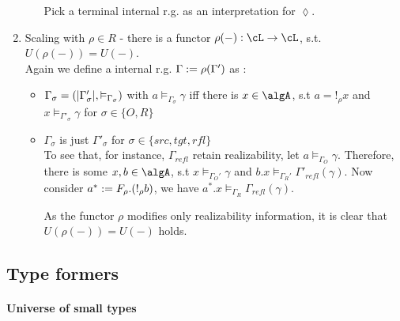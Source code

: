 \documentclass[12pt,a4paper]{article}
\def\rfl{_{refl}}\alwaysmath{rfl}
\renewcommand{\O}{_{O}}\alwaysmath{O}
\def\R{_{R}}\alwaysmath{R}
\begin{document}
\begin{enumerate}[noitemsep]
\begin{itemize}[noitemsep]
    Pick a terminal internal r.g. as an interpretation for $\lozenge$.
  \end{itemize}  
  \item Scaling with $\rho \in R$ - there is a functor $\rho(-) : \cL \to \cL$, s.t. $U(\rho(-)) = U(-)$.\\
  Again we define a internal r.g. $\Gamma := \rho(\Gamma')$ as :
  \begin{itemize}
    \item $\Gamma_\sigma = (|\Gamma'_\sigma|, \vDash_{\Gamma_\sigma})$ with $a \vDash_{\Gamma_\sigma} \gamma$ iff there is $x \in \algA$, s.t $a = !_\rho x$ and $x \vDash_{\Gamma'_\sigma} \gamma$ for $\sigma \in \{O, R\}$
    
    \item $\Gamma_\sigma$ is just $\Gamma'_\sigma$ for $\sigma\in\{src,tgt,rfl\}$ \\
    To see that, for instance, $\Gamma\rfl$ retain realizability, let $a \vDash_{\Gamma\O} \gamma$. Therefore, there is some $x, b \in \algA$, s.t $ x \vDash_{\Gamma\O'} \gamma$ and $b. x \vDash_{\Gamma\R'} \Gamma'\rfl(\gamma)$. Now consider $a^* := F_\rho. (!_\rho b)$, we have $a^* . x \vDash_{\Gamma\R} \Gamma\rfl(\gamma)$.
    
    As the functor $\rho$ modifies only realizability information, it is clear that $U(\rho(-)) = U(-)$ holds.
    
  \end{itemize}
  
\end{enumerate}

\subsection*{Type formers}

\paragraph{Universe of small types}
\end{document}
